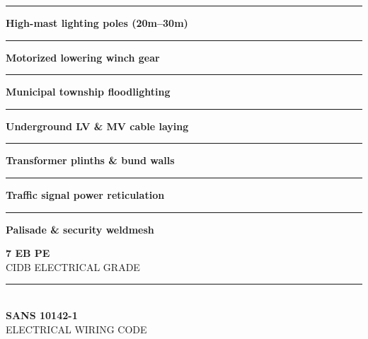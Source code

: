 \begin{minipage}[t]{0.34\textwidth}
    \vspace{0pt}
    \begin{tcolorbox}[
        enhanced, colback=mhoffwhite, colframe=mhnavy, boxrule=1pt, arc=4pt,
        title={\bfseries\color{white}\faBolt\ Electrical Scope of Work},
        colbacktitle=mhnavy, left=7pt, right=7pt, top=6pt, bottom=6pt,
        drop shadow=black!6
    ]
        \fontsize{8.1pt}{11.6pt}\selectfont
        \textcolor{mhnavy}{\rule{4pt}{4pt}}\hspace{4pt}\textbf{High-mast lighting poles (20m--30m)}\\
        \textcolor{mhnavy}{\rule{4pt}{4pt}}\hspace{4pt}\textbf{Motorized lowering winch gear}\\
        \textcolor{mhnavy}{\rule{4pt}{4pt}}\hspace{4pt}\textbf{Municipal township floodlighting}\\
        \textcolor{mhnavy}{\rule{4pt}{4pt}}\hspace{4pt}\textbf{Underground LV \& MV cable laying}\\
        \textcolor{mhnavy}{\rule{4pt}{4pt}}\hspace{4pt}\textbf{Transformer plinths \& bund walls}\\
        \textcolor{mhnavy}{\rule{4pt}{4pt}}\hspace{4pt}\textbf{Traffic signal power reticulation}\\
        \textcolor{mhnavy}{\rule{4pt}{4pt}}\hspace{4pt}\textbf{Palisade \& security weldmesh}
    \end{tcolorbox}

    \vspace{0.20cm}

    \begin{tcolorbox}[
        enhanced, colback=white, colframe=mhlightgray, boxrule=0.8pt, arc=4pt,
        left=6pt, right=6pt, top=6pt, bottom=6pt, halign=center,
        drop shadow=black!4
    ]
        {\fontsize{18pt}{20pt}\selectfont\bfseries\color{mhblue}7 EB PE}\\[1pt]
        {\fontsize{7.4pt}{9pt}\selectfont\color{mhtextmuted}\MakeUppercase{CIDB Electrical Grade}}\\[4pt]
        \textcolor{mhlightgray}{\rule{3.2cm}{0.6pt}}\\[4pt]
        {\fontsize{13pt}{15pt}\selectfont\bfseries\color{mhnavy}SANS 10142-1}\\[1pt]
        {\fontsize{7.2pt}{9pt}\selectfont\color{mhtextmuted}\MakeUppercase{Electrical Wiring Code}}
    \end{tcolorbox}
\end{minipage}

